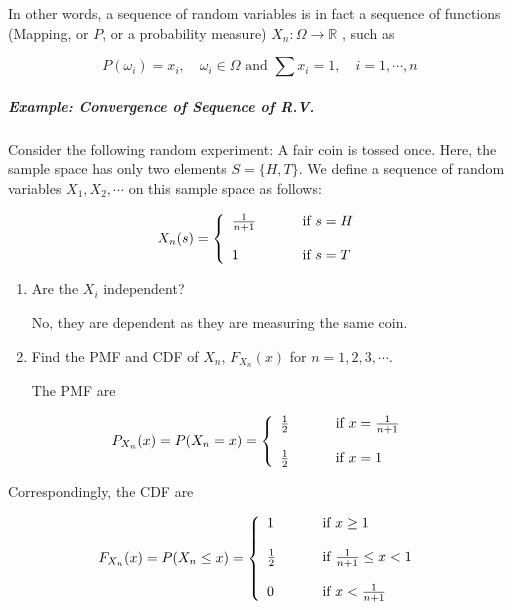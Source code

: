 \documentclass[
  letterpaper,
  DIV=11,
  numbers=noendperiod]{scrreprt}
\let\oldsubparagraph\subparagraph
\renewcommand{\subparagraph}[1]{\oldsubparagraph{#1}\mbox{}}
\theoremstyle{plain}
\theoremstyle{remark}
\begin{document}
In other words, a sequence of random variables is in fact a sequence of
functions (Mapping, or \(P\), or a probability measure)
\(X_n:\Omega\rightarrow \mathbb{R}\) , such as

\[
P(\omega_i)=x_i, \quad \omega_i \in \Omega \text{ and } \sum x_i=1, \quad i = 1,\cdots,n
\]

\hypertarget{example-convergence-of-sequence-of-r.v.}{%
\subparagraph{Example: Convergence of Sequence of
R.V.}\label{example-convergence-of-sequence-of-r.v.}}

Consider the following random experiment: A fair coin is tossed once.
Here, the sample space has only two elements \(S=\{H,T\}\). We define a
sequence of random variables \(X_1,X_2,\cdots\) on this sample space as
follows:

\[
\nonumber X_n(s) = \left\{
\begin{array}{l l}
\frac{1}{n+1} & \qquad \textrm{ if }s=H \\
& \qquad \\
1 & \qquad \textrm{ if }s=T
\end{array} \right.
\]

\begin{enumerate}
\def\labelenumi{\arabic{enumi}.}
\item
  Are the \(X_i\) independent?

  No, they are dependent as they are measuring the same coin.
\item
  Find the PMF and CDF of \(X_n\), \(F_{X_n}(x)\) for
  \(n=1,2,3,\cdots\).

  The PMF are
\end{enumerate}

\[
   \nonumber P_{{\large X_n}}(x)=P(X_n=x) = \left\{
   \begin{array}{l l}
   \frac{1}{2} & \qquad \textrm{ if }x=\frac{1}{n+1} \\
   & \qquad \\
   \frac{1}{2} & \qquad \textrm{ if }x=1
   \end{array} \right.
\]

Correspondingly, the CDF are

\[
   \nonumber F_{{\large X_n}}(x)=P(X_n \leq x) = \left\{
   \begin{array}{l l}
   1 & \qquad \textrm{ if }x \geq 1\\
   & \qquad \\
   \frac{1}{2} & \qquad \textrm{ if }\frac{1}{n+1} \leq x <1 \\
   & \qquad \\
   0 & \qquad \textrm{ if }x< \frac{1}{n+1}
   \end{array} \right.
\]
\end{document}
